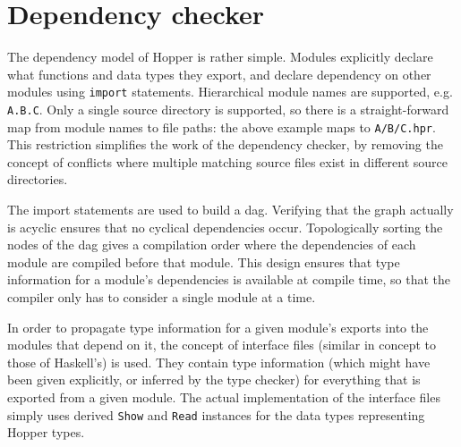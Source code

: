 \section{Dependency checker}
\label{sec:dai_depcheck}

The dependency model of Hopper is rather simple. Modules explicitly declare what functions and data types they export, and declare dependency
on other modules using \texttt{import} statements. Hierarchical module
names are supported, e.g. \texttt{A.B.C}. Only a single
source directory is supported, so there is a straight-forward map from module
names to file paths: the above example maps to \texttt{A/B/C.hpr}. This
restriction simplifies the work of the dependency checker, by removing the concept of conflicts where multiple matching source files exist in different source directories.

The import statements are used to build a \gls{dag}. Verifying that the graph actually is acyclic ensures that no cyclical dependencies occur. Topologically sorting the nodes of the \gls{dag} gives a compilation order where the dependencies of each module are compiled before that module. This design ensures that type information for a module's dependencies is available at compile time, so that the compiler only has to consider a single module at a time.

In order to propagate type information for a given module's exports into the modules that depend on it, the concept of interface files (similar in concept to those of Haskell's) is used. They contain type information (which might have been given explicitly, or inferred by the type checker) for everything that is exported from a given module. The actual implementation of the interface files simply uses derived \texttt{Show} and \texttt{Read} instances for the data types representing Hopper types.


